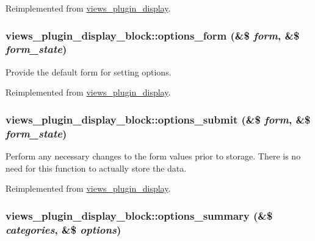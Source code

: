 Reimplemented from \hyperlink{classviews__plugin__display_6eb433a3ccd4225c11b54955d86e2e01}{views\_\-plugin\_\-display}.\hypertarget{classviews__plugin__display__block_251f0aa56cead04c51c4b1d633826640}{
\subsubsection[{options\_\-form}]{\setlength{\rightskip}{0pt plus 5cm}views\_\-plugin\_\-display\_\-block::options\_\-form (\&\$ {\em form}, \/  \&\$ {\em form\_\-state})}}
\label{classviews__plugin__display__block_251f0aa56cead04c51c4b1d633826640}


Provide the default form for setting options. 

Reimplemented from \hyperlink{classviews__plugin__display_d9c69d91ea1165ff51dcd1f1f6d3a154}{views\_\-plugin\_\-display}.\hypertarget{classviews__plugin__display__block_aac31f678cc192896bcfdeb1a8a5a2c7}{
\subsubsection[{options\_\-submit}]{\setlength{\rightskip}{0pt plus 5cm}views\_\-plugin\_\-display\_\-block::options\_\-submit (\&\$ {\em form}, \/  \&\$ {\em form\_\-state})}}
\label{classviews__plugin__display__block_aac31f678cc192896bcfdeb1a8a5a2c7}


Perform any necessary changes to the form values prior to storage. There is no need for this function to actually store the data. 

Reimplemented from \hyperlink{classviews__plugin__display_75f0b2d5587b365640fcb4d414daae36}{views\_\-plugin\_\-display}.\hypertarget{classviews__plugin__display__block_52bb2499272275963128bb2beb5804ce}{
\subsubsection[{options\_\-summary}]{\setlength{\rightskip}{0pt plus 5cm}views\_\-plugin\_\-display\_\-block::options\_\-summary (\&\$ {\em categories}, \/  \&\$ {\em options})}}
\label{classviews__plugin__display__block_52bb2499272275963128bb2beb5804ce}


